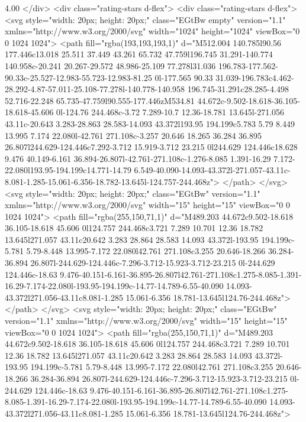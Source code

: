                     4.00
                  </div>
                  <div class="rating-stars d-flex">
                    <div class="rating-stars d-flex">
                      <svg style="width: 20px; height: 20px;" class="EGtBw empty" version="1.1"
                        xmlns="http://www.w3.org/2000/svg" width="1024" height="1024" viewBox="0 0 1024 1024">
                        <path fill="rgba(193,193,193,1)"
                          d="M512.004 140.785l90.56 177.446c13.018 25.511 37.449 43.261 65.732 47.759l196.745 31.291-140.774 140.958c-20.241 20.267-29.572 48.986-25.109 77.278l31.036 196.783-177.562-90.33c-25.527-12.983-55.723-12.983-81.25 0l-177.565 90.33 31.039-196.783c4.462-28.292-4.87-57.011-25.108-77.278l-140.778-140.958 196.745-31.291c28.285-4.498 52.716-22.248 65.735-47.759l90.555-177.446zM534.81 44.672c-9.502-18.618-36.105-18.618-45.606 0l-124.76 244.468c-3.72 7.289-10.7 12.36-18.781 13.645l-271.056 43.11c-20.643 3.283-28.863 28.583-14.093 43.372l193.95 194.199c5.783 5.79 8.449 13.995 7.174 22.080l-42.761 271.108c-3.257 20.646 18.265 36.284 36.895 26.807l244.629-124.446c7.292-3.712 15.919-3.712 23.215 0l244.629 124.446c18.628 9.476 40.149-6.161 36.894-26.807l-42.761-271.108c-1.276-8.085 1.391-16.29 7.172-22.080l193.95-194.199c14.771-14.79 6.549-40.090-14.093-43.372l-271.057-43.11c-8.081-1.285-15.061-6.356-18.782-13.645l-124.757-244.468z">
                        </path>
                      </svg>
                      <svg style="width: 20px; height: 20px;" class="EGtBw" version="1.1"
                        xmlns="http://www.w3.org/2000/svg" width="15" height="15" viewBox="0 0 1024 1024">
                        <path fill="rgba(255,150,71,1)"
                          d="M489.203 44.672c9.502-18.618 36.105-18.618 45.606 0l124.757 244.468c3.721 7.289 10.701 12.36 18.782 13.645l271.057 43.11c20.642 3.283 28.864 28.583 14.093 43.372l-193.95 194.199c-5.781 5.79-8.448 13.995-7.172 22.080l42.761 271.108c3.255 20.646-18.266 36.284-36.894 26.807l-244.629-124.446c-7.296-3.712-15.923-3.712-23.215 0l-244.629 124.446c-18.63 9.476-40.151-6.161-36.895-26.807l42.761-271.108c1.275-8.085-1.391-16.29-7.174-22.080l-193.95-194.199c-14.77-14.789-6.55-40.090 14.093-43.372l271.056-43.11c8.081-1.285 15.061-6.356 18.781-13.645l124.76-244.468z">
                        </path>
                      </svg>
                      <svg style="width: 20px; height: 20px;" class="EGtBw" version="1.1"
                        xmlns="http://www.w3.org/2000/svg" width="15" height="15" viewBox="0 0 1024 1024">
                        <path fill="rgba(255,150,71,1)"
                          d="M489.203 44.672c9.502-18.618 36.105-18.618 45.606 0l124.757 244.468c3.721 7.289 10.701 12.36 18.782 13.645l271.057 43.11c20.642 3.283 28.864 28.583 14.093 43.372l-193.95 194.199c-5.781 5.79-8.448 13.995-7.172 22.080l42.761 271.108c3.255 20.646-18.266 36.284-36.894 26.807l-244.629-124.446c-7.296-3.712-15.923-3.712-23.215 0l-244.629 124.446c-18.63 9.476-40.151-6.161-36.895-26.807l42.761-271.108c1.275-8.085-1.391-16.29-7.174-22.080l-193.95-194.199c-14.77-14.789-6.55-40.090 14.093-43.372l271.056-43.11c8.081-1.285 15.061-6.356 18.781-13.645l124.76-244.468z">
